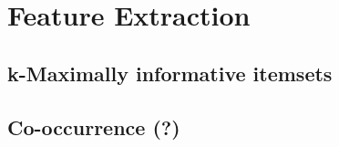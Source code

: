 \section{Feature Extraction}
\label{sec:feature_extraction}






\subsection{k-Maximally informative itemsets}
\label{sec:miki}




\subsection{Co-occurrence (?)}
\label{sec:co-occurrence}
